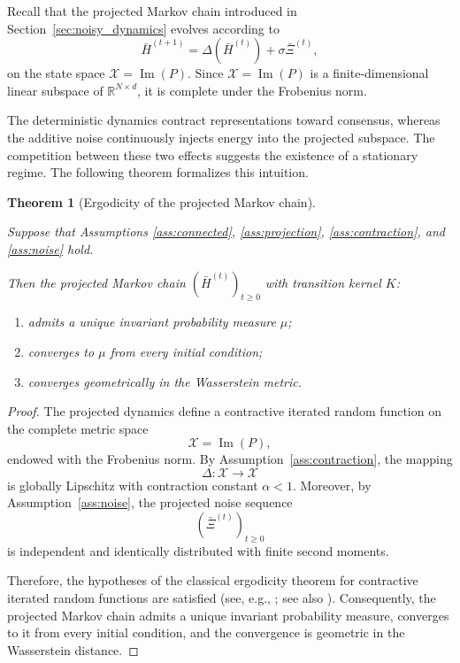 \documentclass{article}
\newtheorem{theorem}{Theorem}[section]
\begin{document}
Recall that the projected Markov chain introduced in
Section~\ref{sec:noisy_dynamics}
evolves according to
\[
\bar H^{(t+1)}
=
\Delta(\bar H^{(t)})
+
\sigma\bar\Xi^{(t)},
\]
on the state space
$\mathcal X=\operatorname{Im}(P)$.
Since $\mathcal X=\operatorname{Im}(P)$ is a finite-dimensional linear subspace of $\mathbb R^{N\times d}$, it is complete under the Frobenius norm.

The deterministic dynamics contract representations toward consensus, whereas the additive noise continuously injects energy into the projected subspace. The competition between these two effects suggests the existence of a stationary regime. The following theorem formalizes this intuition.

\begin{theorem}[Ergodicity of the projected Markov chain]
	\label{thm:ergodicity}
	
Suppose that Assumptions
\ref{ass:connected},
\ref{ass:projection},
\ref{ass:contraction},
and
\ref{ass:noise}
hold.
	
Then the projected Markov chain
$(\bar H^{(t)})_{t\ge0}$
with transition kernel $K$:
	\begin{enumerate}
		
		\item admits a unique invariant probability measure
		$\mu$;
		
		\item converges to $\mu$ from every initial condition;
		
		\item converges geometrically in the Wasserstein metric.
		
	\end{enumerate}	
\end{theorem}


\begin{proof}	
	The projected dynamics define a contractive iterated random function on the
	complete metric space
	\[
	\mathcal X=\operatorname{Im}(P),
	\]
	endowed with the Frobenius norm.
	By Assumption~\ref{ass:contraction}, the mapping
	\[
	\Delta:\mathcal X\rightarrow\mathcal X
	\]
	is globally Lipschitz with contraction constant
	\(\alpha<1\).
	Moreover, by Assumption~\ref{ass:noise}, the projected noise sequence
	\[
	(\bar\Xi^{(t)})_{t\ge0}
	\]
	is independent and identically distributed with finite second moments.
	
Therefore, the hypotheses of the classical ergodicity theorem for
contractive iterated random functions are satisfied
(see, e.g.,
\cite[Theorem~1]{diaconis1999iterated};
see also
\cite{hairer2011}).
	Consequently, the projected Markov chain admits a unique invariant
	probability measure, converges to it from every initial condition, and
	the convergence is geometric in the Wasserstein distance.	
\end{proof}
\end{document}
